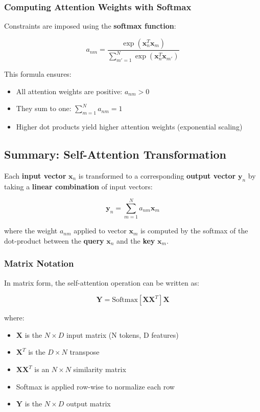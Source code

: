 \documentclass[11pt,a4paper]{article}
\theoremstyle{definition}
\theoremstyle{plain}
\theoremstyle{remark}
\begin{document}
\subsubsection{Computing Attention Weights with Softmax}

Constraints are imposed using the \textbf{softmax function}:

\[
a_{nm} = \frac{\exp(\mathbf{x}_n^T \mathbf{x}_m)}{\sum_{m'=1}^{N} \exp(\mathbf{x}_n^T \mathbf{x}_{m'})}
\]

This formula ensures:
\begin{itemize}
    \item All attention weights are positive: $a_{nm} > 0$
    \item They sum to one: $\sum_{m=1}^{N} a_{nm} = 1$
    \item Higher dot products yield higher attention weights (exponential scaling)
\end{itemize}

\subsection{Summary: Self-Attention Transformation}

\begin{tcolorbox}[colback=red!10!white,colframe=red!75!black,title=\textbf{Self-Attention Formula}]
Each \textbf{input vector} $\mathbf{x}_n$ is transformed to a corresponding \textbf{output vector} $\mathbf{y}_n$ by taking a \textbf{linear combination} of input vectors:

\[
\mathbf{y}_n = \sum_{m=1}^{N} a_{nm} \mathbf{x}_m
\]

where the weight $a_{nm}$ applied to vector $\mathbf{x}_m$ is computed by the softmax of the dot-product between the \textbf{query} $\mathbf{x}_n$ and the \textbf{key} $\mathbf{x}_m$.
\end{tcolorbox}

\subsubsection{Matrix Notation}

In matrix form, the self-attention operation can be written as:

\[
\mathbf{Y} = \text{Softmax}[\mathbf{X}\mathbf{X}^T]\mathbf{X}
\]

where:
\begin{itemize}
    \item $\mathbf{X}$ is the $N \times D$ input matrix (N tokens, D features)
    \item $\mathbf{X}^T$ is the $D \times N$ transpose
    \item $\mathbf{X}\mathbf{X}^T$ is an $N \times N$ similarity matrix
    \item Softmax is applied row-wise to normalize each row
    \item $\mathbf{Y}$ is the $N \times D$ output matrix
\end{itemize}
\end{document}
